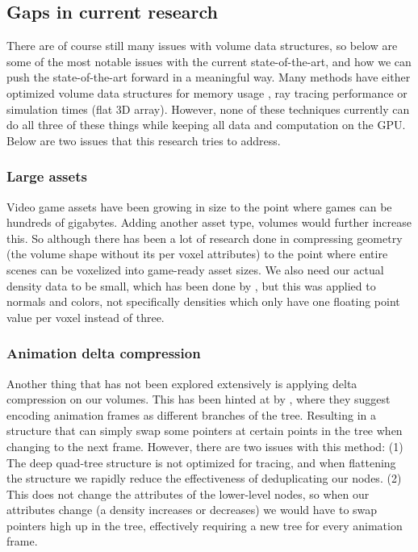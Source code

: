\subsection{Gaps in current research} \label{related_work:gaps_in_current_research}
There are of course still many issues with volume data structures, so below are some of the most notable issues with the current state-of-the-art, and how we can push the state-of-the-art forward in a meaningful way. Many methods have either optimized volume data structures for memory usage \cite{laine2010efficient}\cite{kampe2013high}, ray tracing performance \cite{van2015real} \cite{soderlund2022ray} \cite{museth2013vdb} or simulation times (flat 3D array). However, none of these techniques currently can do all three of these things while keeping all data and computation on the GPU. Below are two issues that this research tries to address.
\subsubsection{Large assets} \label{related_work:gaps_in_current_research:large_assets}
Video game assets have been growing in size to the point where games can be hundreds of gigabytes. Adding another asset type, volumes would further increase this. So although there has been a lot of research done in compressing geometry (the volume shape without its per voxel attributes) to the point where entire scenes can be voxelized into game-ready asset sizes\cite{van2015real}\cite{museth2013vdb}. We also need our actual density data to be small, which has been done by \cite{dado2016geometry}, but this was applied to normals and colors, not specifically densities which only have one floating point value per voxel instead of three.
\subsubsection{Animation delta compression} \label{related_work:gaps_in_current_research:animation_delta_compression}
Another thing that has not been explored extensively is applying delta compression on our volumes. This has been hinted at by \cite{careil2020interactively}, where they suggest encoding animation frames as different branches of the tree. Resulting in a structure that can simply swap some pointers at certain points in the tree when changing to the next frame. However, there are two issues with this method: (1) The deep quad-tree structure is not optimized for tracing, and when flattening the structure we rapidly reduce the effectiveness of deduplicating our nodes. (2) This does not change the attributes of the lower-level nodes, so when our attributes change (a density increases or decreases) we would have to swap pointers high up in the tree, effectively requiring a new tree for every animation frame.